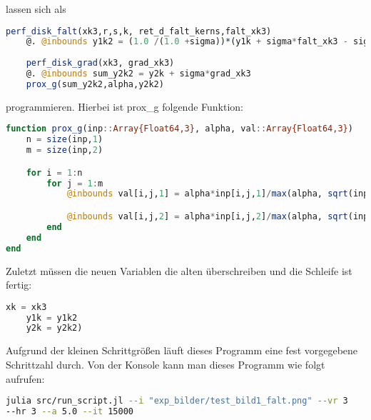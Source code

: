 \documentclass{article}
\theoremstyle{case}
\begin{document}
lassen sich als
\begin{lstlisting}[language=Julia]
	perf_disk_falt(xk3,r,s,k, ret_d_falt_kerns,falt_xk3)
	@. @inbounds y1k2 = (1.0 /(1.0 +sigma))*(y1k + sigma*falt_xk3 - sigma*bild)
			
	perf_disk_grad(xk3, grad_xk3)
	@. @inbounds sum_y2k2 = y2k + sigma*grad_xk3
	prox_g(sum_y2k2,alpha,y2k2)
\end{lstlisting}
programmieren. Hierbei ist prox_g folgende Funktion:
\begin{lstlisting}[language=Julia]
function prox_g(inp::Array{Float64,3}, alpha, val::Array{Float64,3})
	n = size(inp,1)
	m = size(inp,2)

	for i = 1:n
		for j = 1:m
			@inbounds val[i,j,1] = alpha*inp[i,j,1]/max(alpha, sqrt(inp[i,j,1]^2 + inp[i,j,2]^2))

			@inbounds val[i,j,2] = alpha*inp[i,j,2]/max(alpha, sqrt(inp[i,j,1]^2 + inp[i,j,2]^2))
		end
	end
end

\end{lstlisting}

Zuletzt müssen die neuen Variablen die alten überschreiben und die Schleife ist fertig:
\begin{lstlisting}[language=Julia]
	xk = xk3
	y1k = y1k2
	y2k = y2k2)
\end{lstlisting}
Aufgrund der kleinen Schrittgrößen läuft dieses Programm eine fest vorgegebene Schrittzahl durch.
\newline
Von der Konsole kann man dieses Programm wie folgt aufrufen:
\begin{lstlisting}[language=bash]
julia src/run_script.jl --i "exp_bilder/test_bild1_falt.png" --vr 3
--hr 3 --a 5.0 --it 15000
\end{lstlisting}





%
%
\end{document}
